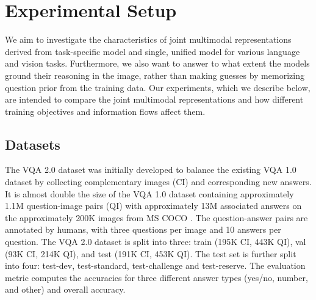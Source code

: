 \documentclass{article}
\begin{document}
\section{Experimental Setup}
We aim to investigate the characteristics of joint multimodal representations derived from task-specific model and single, unified model for various language and vision tasks. Furthermore, we also want to answer to what extent the models ground their reasoning in the image, rather than making guesses by memorizing question prior from the training data. Our experiments, which we describe below, are intended to compare the joint multimodal representations and how different training objectives and information flows affect them.


\subsection{Datasets} \label{subsection:datasets}

The VQA 2.0 dataset \citep{goyal2017vqa2} was initially developed to balance the existing VQA 1.0 dataset \citet{antol2015vqa} by collecting complementary images (CI) and corresponding new answers. It is almost double the size of the VQA 1.0 dataset containing approximately 1.1M question-image pairs (QI) with approximately 13M associated answers on the approximately 200K images from MS COCO \citep{coco}. The question-answer pairs are annotated by humans, with three questions per image and 10 answers per question. The VQA 2.0 dataset is split into three: train (195K CI, 443K QI), val (93K CI, 214K QI), and test (191K CI, 453K QI). The test set is further split into four: test-dev, test-standard, test-challenge and test-reserve. The evaluation metric computes the accuracies for three different answer types (yes/no, number, and other) and overall accuracy.
\end{document}
